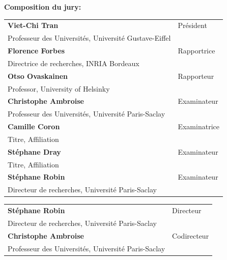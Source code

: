 \begin{titlepage}
\vspace{\fill} %

\flushleft \small \textbf{Composition du jury:}
\bigskip



\scriptsize
\begin{tabular}{|p{8cm}l}
\arrayrulecolor{Prune}
\textbf{Viet-Chi Tran} &   Président\\ 
Professeur des Universités, Université Gustave-Eiffel & \\
\textbf{Florence Forbes} &  Rapportrice \\ 
Directrice de recherches, INRIA Bordeaux   &   \\ 
\textbf{Otso Ovaskainen} &  Rapporteur \\ 
Professor, University of Helsinky  &   \\ 
\textbf{Christophe Ambroise} &  Examinateur \\ 
Professeur des Universités, Université Paris-Saclay  &   \\ 
\textbf{Camille Coron} &  Examinatrice \\ 
Titre, Affiliation   &   \\ 
\textbf{Stéphane Dray} &  Examinateur \\ 
Titre, Affiliation   &   \\ 
\textbf{Stéphane Robin} &   Examinateur\\ 
Directeur de recherches, Université Paris-Saclay & \\

\end{tabular} 

\medskip
\begin{tabular}{|p{8cm}l}\arrayrulecolor{white}
\textbf{Stéphane Robin} &   Directeur\\ 
Directeur de recherches, Université Paris-Saclay & \\
\textbf{Christophe Ambroise} &   Codirecteur\\ 
Professeur des Universités, Université Paris-Saclay  &   \\ 


\end{tabular} 


\end{titlepage}
